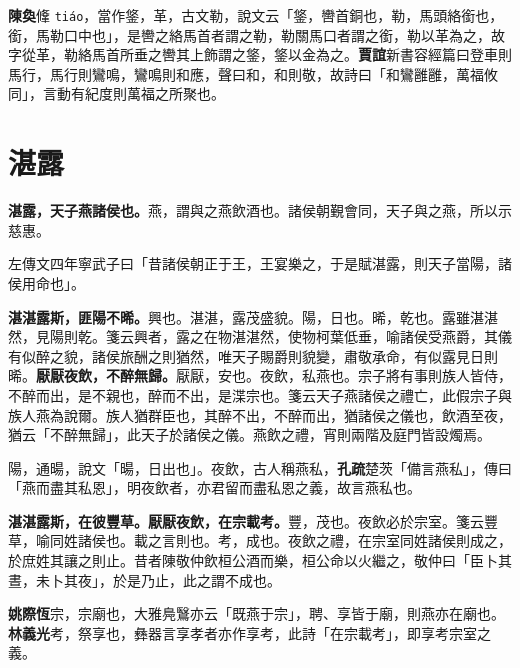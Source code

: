 \begin{quoting}\textbf{陳奐}鞗 \texttt{tiáo}，當作鋚，革，古文勒，說文云「鋚，轡首銅也，勒，馬頭絡銜也，銜，馬勒口中也」，是轡之絡馬首者謂之勒，勒關馬口者謂之銜，勒以革為之，故字從革，勒絡馬首所垂之轡其上飾謂之鋚，鋚以金為之。\textbf{賈誼}新書容經篇曰登車則馬行，馬行則鸞鳴，鸞鳴則和應，聲曰和，和則敬，故詩曰「和鸞雝雝，萬福攸同」，言動有紀度則萬福之所聚也。\end{quoting}

\section{湛露}


\textbf{湛露，天子燕諸侯也。}{\footnotesize 燕，謂與之燕飲酒也。諸侯朝覲會同，天子與之燕，所以示慈惠。}

\begin{quoting}左傳文四年寧武子曰「昔諸侯朝正于王，王宴樂之，于是賦湛露，則天子當陽，諸侯用命也」。\end{quoting}

\textbf{湛湛露斯，匪陽不晞。}{\footnotesize 興也。湛湛，露茂盛貌。陽，日也。晞，乾也。露雖湛湛然，見陽則乾。箋云興者，露之在物湛湛然，使物柯葉低垂，喻諸侯受燕爵，其儀有似醉之貌，諸侯旅酬之則猶然，唯天子賜爵則貌變，肅敬承命，有似露見日則晞。}\textbf{厭厭夜飲，不醉無歸。}{\footnotesize 厭厭，安也。夜飲，私燕也。宗子將有事則族人皆侍，不醉而出，是不親也，醉而不出，是渫宗也。箋云天子燕諸侯之禮亡，此假宗子與族人燕為說爾。族人猶群臣也，其醉不出，不醉而出，猶諸侯之儀也，飲酒至夜，猶云「不醉無歸」，此天子於諸侯之儀。燕飲之禮，宵則兩階及庭門皆設燭焉。}

\begin{quoting}陽，通暘，說文「暘，日出也」。夜飲，古人稱燕私，\textbf{孔疏}楚茨「備言燕私」，傳曰「燕而盡其私恩」，明夜飲者，亦君留而盡私恩之義，故言燕私也。\end{quoting}

\textbf{湛湛露斯，在彼豐草。厭厭夜飲，在宗載考。}{\footnotesize 豐，茂也。夜飲必於宗室。箋云豐草，喻同姓諸侯也。載之言則也。考，成也。夜飲之禮，在宗室同姓諸侯則成之，於庶姓其讓之則止。昔者陳敬仲飲桓公酒而樂，桓公命以火繼之，敬仲曰「臣卜其晝，未卜其夜」，於是乃止，此之謂不成也。}

\begin{quoting}\textbf{姚際恆}宗，宗廟也，大雅鳧鷖亦云「既燕于宗」，聘、享皆于廟，則燕亦在廟也。\textbf{林義光}考，祭享也，彝器言享孝者亦作享考，此詩「在宗載考」，即享考宗室之義。\end{quoting}

